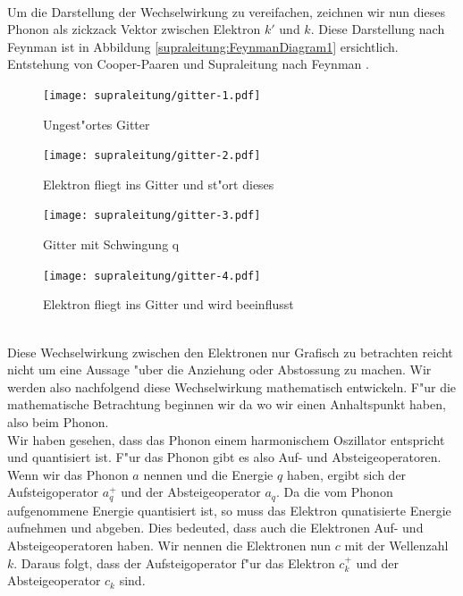 \begin{refsection}
\\
Um die Darstellung der Wechselwirkung zu vereifachen, zeichnen wir nun dieses Phonon als zickzack Vektor zwischen Elektron $k'$ und $k$. Diese Darstellung nach Feynman ist in Abbildung \ref{supraleitung:FeynmanDiagram1} ersichtlich.
\\

Entstehung von Cooper-Paaren und Supraleitung nach Feynman
\cite{supraleitung:feynman}.
\begin{figure}
\centering
\texttt{[image: supraleitung/gitter-1.pdf]} %
\caption{Ungest"ortes Gitter
\label{supraleitung:Gitter1}}
\end{figure}
\begin{figure}
\centering
\texttt{[image: supraleitung/gitter-2.pdf]} %
\caption{Elektron fliegt ins Gitter und st"ort dieses
\label{supraleitung:Gitter2}}
\end{figure}
\begin{figure}
\centering
\texttt{[image: supraleitung/gitter-3.pdf]} %
\caption{Gitter mit Schwingung q
\label{supraleitung:Gitter3}}
\end{figure}
\begin{figure}
\centering
\texttt{[image: supraleitung/gitter-4.pdf]} %
\caption{Elektron fliegt ins Gitter und wird beeinflusst
\label{supraleitung:Gitter4}}
\end{figure}
\\
Diese Wechselwirkung zwischen den Elektronen nur Grafisch zu betrachten reicht nicht um eine Aussage "uber die Anziehung oder Abstossung zu machen. Wir werden also nachfolgend diese Wechselwirkung mathematisch entwickeln. F"ur die mathematische Betrachtung beginnen wir da wo wir einen Anhaltspunkt haben, also beim Phonon.
\\
Wir haben gesehen, dass das Phonon einem harmonischem Oszillator entspricht und quantisiert ist. F"ur das Phonon gibt es also Auf- und Absteigeoperatoren. Wenn wir das Phonon $a$ nennen und die Energie $q$ haben, ergibt sich der Aufsteigoperator $a^+_q$ und der Absteigeoperator $a_q$. Da die vom Phonon aufgenommene Energie quantisiert ist, so muss das Elektron qunatisierte Energie aufnehmen und abgeben. Dies bedeuted, dass auch die Elektronen Auf- und Absteigeoperatoren haben. Wir nennen die Elektronen nun $c$ mit der Wellenzahl $k$. Daraus folgt, dass der Aufsteigoperator f"ur das Elektron $c^+_k$ und der Absteigeoperator $c_k$ sind.

\end{refsection}
